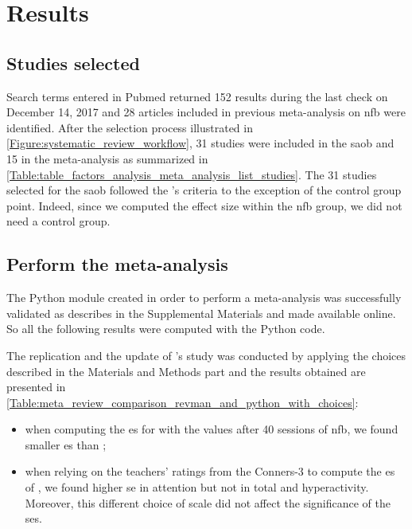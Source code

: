 


\section{Results}

\subsection{Studies selected}

Search terms entered in Pubmed returned 152 results during the last check on December 14, 2017 and 28 articles included in previous
meta-analysis on \gls{nfb} were identified. After the selection process illustrated in \cref{Figure:systematic_review_workflow}, 
31 studies were included in the \gls{saob} and 15 in the meta-analysis as summarized in \cref{Table:table_factors_analysis_meta_analysis_list_studies}.
The 31 studies selected for the \gls{saob} followed the \citeauthor{Cortese2016}'s criteria to the exception of the control group point. 
Indeed, since we computed the effect size within the \gls{nfb} group, we did not need a control group.

\subsection{Perform the meta-analysis}

The Python module created in order to perform a meta-analysis was successfully validated as describes in the Supplemental Materials and made available online.
So all the following results were computed with the Python code. 

The replication and the update of \citeauthor{Cortese2016}'s study was conducted by applying the choices described in the Materials and Methods part 
and the results obtained are presented in \cref{Table:meta_review_comparison_revman_and_python_with_choices}:

\begin{itemize}
    \item when computing the \gls{es} for \citet{Arnold2014} with the values after 40 sessions of \gls{nfb}, we found smaller \gls{es} than \citet{Cortese2016};  
    \item when relying on the teachers' ratings from the Conners-3 to compute the \gls{es} of \citet{Steiner2014}, we found higher \gls{se} in attention but not 
		in total and hyperactivity. Moreover, this different choice of scale did not affect the significance of the \glspl{se}.
\end{itemize}

